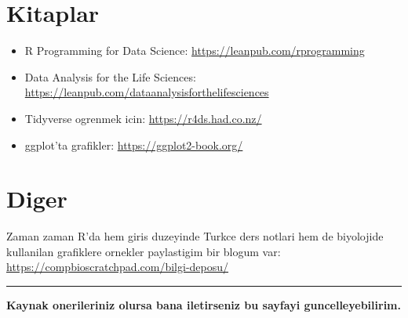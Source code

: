 \documentclass[
]{book}
\begin{document}
\hypertarget{kitaplar}{%
\section{Kitaplar}\label{kitaplar}}

\begin{itemize}
\item
  R Programming for Data Science: \url{https://leanpub.com/rprogramming}
\item
  Data Analysis for the Life Sciences: \url{https://leanpub.com/dataanalysisforthelifesciences}
\item
  Tidyverse ogrenmek icin: \url{https://r4ds.had.co.nz/}
\item
  ggplot'ta grafikler: \url{https://ggplot2-book.org/}
\end{itemize}

\hypertarget{diger}{%
\section{Diger}\label{diger}}

Zaman zaman R'da hem giris duzeyinde Turkce ders notlari hem de biyolojide kullanilan grafiklere ornekler paylastigim bir blogum var: \url{https://compbioscratchpad.com/bilgi-deposu/}

\begin{center}\rule{0.5\linewidth}{0.5pt}\end{center}

\textbf{Kaynak onerileriniz olursa bana iletirseniz bu sayfayi guncelleyebilirim.}

  
\end{document}
